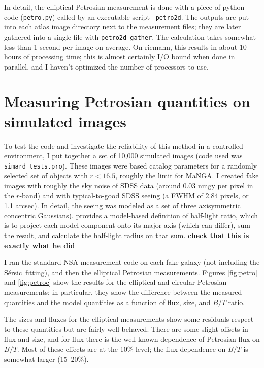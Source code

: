 \documentclass[10pt,preprint]{aastex}
\newcommand{\Sersic}{S\'ersic}
\begin{document}
In detail, the elliptical Petrosian measurement is done with a piece
of python code ({\tt petro.py}) called by an executable script {\tt
  petro2d}. The outputs are put into each atlas image directory next
to the measurement files; they are later gathered into a single file
with {\tt petro2d\_gather}. The calculation takes somewhat less than 1
second per image on average. On riemann, this results in about 10
hours of processing time; this is almost certainly I/O bound when done
in parallel, and I haven't optimized the number of processors to use.

\section{Measuring Petrosian quantities on simulated images} 
\label{sec:models}

To test the code and investigate the reliability of this method in a
controlled environment, I put together a set of 10,000 simulated
images (code used was {\tt simard\_tests.pro}). These images were
based \citet{simard11a} catalog parameters for a randomly selected set
of objects with $r<16.5$, roughly the limit for MaNGA. I created fake
images with roughly the sky noise of SDSS data (around 0.03 nmgy per
pixel in the $r$-band) and with typical-to-good SDSS seeing (a FWHM of
2.84 pixels, or 1.1 arcsec). In detail, the seeing was modeled as a
set of three axisymmetric concentric Gaussians). \citet{simard11a}
provides a model-based definition of half-light ratio, which is to
project each model component onto its major axis (which can differ),
sum the result, and calculate the half-light radius on that sum. {\bf
  check that this is exactly what he did}

I ran the standard NSA measurement code on each fake galaxy (not
including the \Sersic\ fitting), and then the elliptical Petrosian
measurements. Figures \ref{fig:petro} and \ref{fig:petroc} show the
results for the elliptical and circular Petrosian measurements; in
particular, they show the difference between the measured quantities
and the model quantities as a function of flux, size, and $B/T$
ratio. 

The sizes and fluxes for the elliptical measurements show some
residuals respect to these quantities but are fairly
well-behaved. There are some slight offsets in flux and size, and for
flux there is the well-known dependence of Petrosian flux on
$B/T$. Most of these effects are at the 10\% level; the flux
dependence on $B/T$ is somewhat larger (15--20\%).
\end{document}
